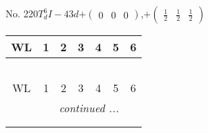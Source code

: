 \documentclass[fleqn,9pt,landscape]{jsarticle}
\begin{document}
\newpage
No. 220\quad$T_{d}^{6}$\quad$I-43d$\quad[ cubic ]\quad$+\begin{pmatrix} 0 & 0 & 0 \end{pmatrix}$,\quad $+\begin{pmatrix} \frac{1}{2} & \frac{1}{2} & \frac{1}{2} \end{pmatrix}$
\begin{center}
\renewcommand{\arraystretch}{1.2}
\begin{longtable}{ccccccc}
 \hline \hline
WL & 1 & 2 & 3 & 4 & 5 & 6 \\ \hline \endfirsthead

\multicolumn{6}{l}{\tablename\ \thetable{}} \\
 \hline \hline
WL & 1 & 2 & 3 & 4 & 5 & 6 \\ \hline \endhead

 \hline \hline
\multicolumn{6}{r}{\footnotesize\it continued ...} \\ \endfoot

 \hline \hline
\multicolumn{6}{r}{} \\ \endlastfoot


\end{longtable}
\end{center}
\end{document}
